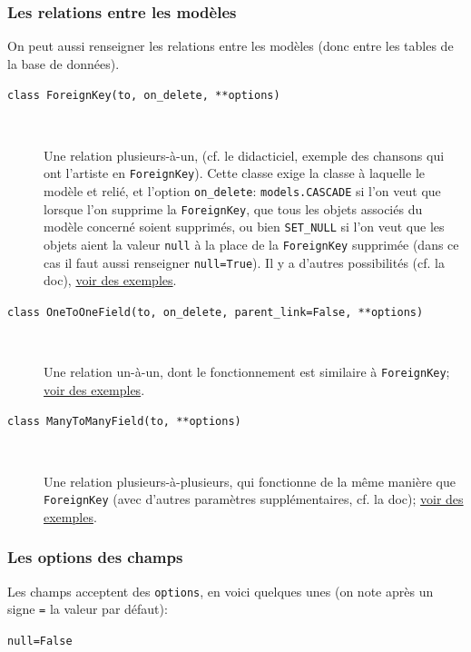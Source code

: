 \documentclass[a4paper, 10pt]{article}
\begin{document}
{\subsubsection{Les relations entre les modèles}

On  peut aussi renseigner les relations entre les modèles (donc entre les tables de la base de données).
\begin{description}
    \item[\texttt{class ForeignKey(to, on_delete, **options)}]~

    Une relation plusieurs-à-un, (cf. le didacticiel, exemple des chansons qui ont l'artiste en \texttt{ForeignKey}). Cette classe exige la classe à laquelle le modèle et relié, et l'option \texttt{on\_delete}: \texttt{models.CASCADE} si l'on veut que lorsque l'on supprime la \texttt{ForeignKey}, que tous les objets associés du modèle concerné soient supprimés, ou bien \texttt{SET\_NULL} si l'on veut que les objets aient la valeur \texttt{null} à la place de la \texttt{ForeignKey} supprimée (dans ce cas il faut aussi renseigner \texttt{null=True}). Il y a d'autres possibilités (cf. la doc), \href{https://docs.djangoproject.com/fr/2.0/topics/db/examples/many_to_one/}{voir des exemples}.

    \item[\texttt{class OneToOneField(to, on_delete, parent_link=False, **options)}]~

    Une relation un-à-un, dont le fonctionnement est similaire à \texttt{ForeignKey}; \href{https://docs.djangoproject.com/fr/2.0/topics/db/examples/one_to_one/}{voir des exemples}.

    \item[\texttt{class ManyToManyField(to, **options)}]~

    Une relation plusieurs-à-plusieurs, qui fonctionne de la même manière que \texttt{ForeignKey} (avec d'autres paramètres supplémentaires, cf. la doc); \href{https://docs.djangoproject.com/fr/2.0/topics/db/examples/many_to_many/}{voir des exemples}.
\end{description}

\subsubsection{Les options des champs}
Les champs acceptent des \texttt{options}, en voici quelques unes (on note après un signe \texttt{=} la valeur par défaut):
\begin{description}
    \item[\texttt{null=False}]~


\end{description}}
\end{document}
